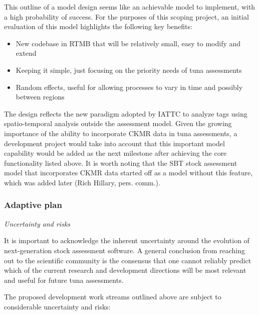 \documentclass{SCreport}
\begin{document}
\vspace{2ex}

This outline of a model design seems like an achievable model to implement, with
a high probability of success. For the purposes of this scoping project, an
initial evaluation of this model highlights the following key benefits:

\begin{itemize}
  \item New codebase in RTMB that will be relatively small, easy to modify and
  extend\\[-4ex]
  \item Keeping it simple, just focusing on the priority needs of tuna
  assessments\\[-4ex]
  \item Random effects, useful for allowing processes to vary in time and
  possibly between regions
\end{itemize}

\vspace{2ex}

The design reflects the new paradigm adopted by IATTC to analyze tags using
spatio-temporal analysis outside the assessment model. Given the growing
importance of the ability to incorporate CKMR data in tuna assessments, a
development project would take into account that this important model capability
would be added as the next milestone after achieving the core functionality
listed above. It is worth noting that the SBT stock assessment model that
incorporates CKMR data started off as a model without this feature, which was
added later (Rich Hillary, pers. comm.).

\newpage

\subsubsection{Adaptive plan}

\textit{Uncertainty and risks}

It is important to acknowledge the inherent uncertainty around the evolution of
next-generation stock assessment software. A general conclusion from reaching
out to the scientific community is the consensus that one cannot reliably
predict which of the current research and development directions will be most
relevant and useful for future tuna assessments.

The proposed development work streams outlined above are subject to considerable
uncertainty and risks:
\end{document}
